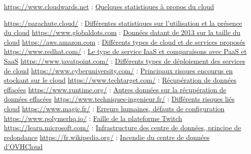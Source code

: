 \documentclass[a4paper, 12pt]{article}
\begin{document}
\begin{spacing}{1.1}
\begin{thebibliography}{3}
    \bibitem{} \url{https://www.cloudwards.net} : \href{https://www.cloudwards.net/cloud-computing-statistics/}{Quelques statistiques à propos du cloud}

    \bibitem{} \url{https://parachute.cloud/} : \href{https://parachute.cloud/cloud-computing-statistics/}{Différentes statistiques sur l'utilisation et la présence du cloud}
    \bibitem{} \url{https://www.globaldots.com} : \href{https://www.globaldots.com/resources/blog/how-much-is-stored-in-the-cloud/}{Données datant de 2013 sur la taille du cloud}
    \bibitem{} \url{https://aws.amazon.com} : \href{https://aws.amazon.com/fr/types-of-cloud-computing/}{Différents types de cloud et de services proposés}
    \bibitem{} \url{https://www.redhat.com/} : \href{https://www.redhat.com/fr/topics/cloud-computing/what-is-iaas}{Le type de service IaaS et comparaisons avec PaaS et SaaS}
    \bibitem{} \url{https://www.javatpoint.com/} : \href{https://www.javatpoint.com/cloud-deployment-model}{Différents types de déploiement des services de cloud}
    \bibitem{} \url{https://www.cyberuniversity.com/} : \href{https://www.cyberuniversity.com/post/la-securite-dans-le-cloud-principaux-risques-et-challenges}{Principaux risques encourus en stockant sur le cloud}
    \bibitem{} \url{https://www.techtarget.com/} : \href{https://www.techtarget.com/searchdisasterrecovery/definition/data-recovery}{Récupération de données effacées}
    \bibitem{} \url{https://www.runtime.org/} : \href{https://www.runtime.org/recoverability.htm}{Autres données sur la récupération de données effacées}
    \bibitem{} \url{https://www.techniques-ingenieur.fr/} : \href{https://www.techniques-ingenieur.fr/actualite/articles/la-securite-dans-le-cloud-une-approche-fournisseur-basee-sur-les-risques-15550/}{Différents risques liés cloud}
    \bibitem{} \url{https://www.magic.fr/} : \href{https://www.magic.fr/cloud-public-les-erreurs-de-configuration-sont-extremement-frequentes/}{Erreurs humaines, défauts de configuration}
    \bibitem{} \url{https://www.polymerhq.io/} : \href{https://www.polymerhq.io/blog/breach/how-did-the-twitch-data-leak-happen/}{Faille de la plateforme Twitch}
    \bibitem{} \url{https://learn.microsoft.com/} : \href{https://learn.microsoft.com/fr-fr/compliance/assurance/assurance-datacenter-architecture-infrastructure}{Infrastructure des centre de données, principe  de redondance}
    \bibitem{} \url{https://fr.wikipedia.org/} : \href{https://fr.wikipedia.org/wiki/Incendie_du_centre_de_donn%C3%A9es_d%27OVHcloud_%C3%A0_Strasbourg}{Incendie du centre de données d'OVHCloud}


\end{thebibliography}
\end{spacing}
\end{document}
